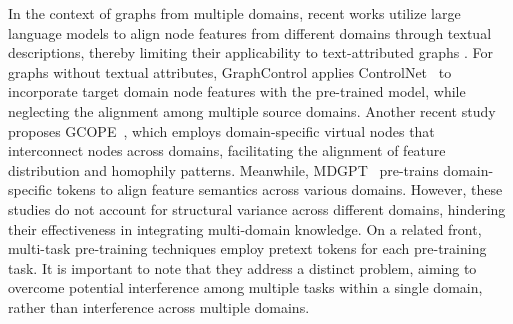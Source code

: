In the context of graphs from multiple domains, recent works \cite{liu2023one,tang2024higpt,xia2024opengraph} utilize large language models to align node features from different domains through textual descriptions, thereby limiting their applicability to text-attributed graphs \cite{zhaolearning,wen2023prompt,zhang2024text}. For graphs without textual attributes, GraphControl \cite{zhu2024graphcontrol} applies ControlNet~\cite{zhang2023adding} to incorporate target domain node features with the pre-trained model, while neglecting the alignment among multiple source domains. Another recent study proposes GCOPE~\cite{zhao2024all}, which employs domain-specific virtual nodes that interconnect nodes across domains, facilitating the alignment of feature distribution and homophily patterns. Meanwhile, MDGPT~\cite{yu2024text} pre-trains domain-specific tokens to align feature semantics across various domains. However, these studies do not account for structural variance across different domains, hindering their effectiveness in integrating multi-domain knowledge. On a related front, multi-task pre-training techniques \cite{wang2022multi,yu2023multigprompt} employ pretext tokens for each pre-training task. It is important to note that they address a distinct problem, aiming to overcome potential interference among multiple tasks within a single domain, rather than interference across multiple domains. 

